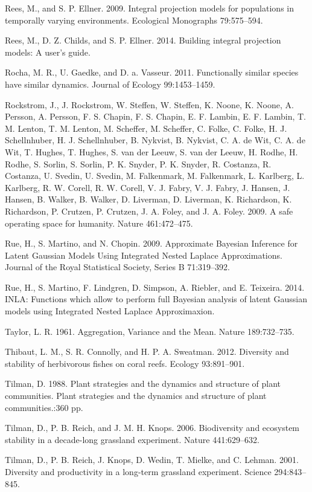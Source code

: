 \documentclass[12pt,]{article}
\begin{document}
Rees, M., and S. P. Ellner. 2009. Integral projection models for
populations in temporally varying environments. Ecological Monographs
79:575--594.

Rees, M., D. Z. Childs, and S. P. Ellner. 2014. Building integral
projection models: A user's guide.

Rocha, M. R., U. Gaedke, and D. a. Vasseur. 2011. Functionally similar
species have similar dynamics. Journal of Ecology 99:1453--1459.

Rockstrom, J., J. Rockstrom, W. Steffen, W. Steffen, K. Noone, K. Noone,
A. Persson, A. Persson, F. S. Chapin, F. S. Chapin, E. F. Lambin, E. F.
Lambin, T. M. Lenton, T. M. Lenton, M. Scheffer, M. Scheffer, C. Folke,
C. Folke, H. J. Schellnhuber, H. J. Schellnhuber, B. Nykvist, B.
Nykvist, C. A. de Wit, C. A. de Wit, T. Hughes, T. Hughes, S. van der
Leeuw, S. van der Leeuw, H. Rodhe, H. Rodhe, S. Sorlin, S. Sorlin, P. K.
Snyder, P. K. Snyder, R. Costanza, R. Costanza, U. Svedin, U. Svedin, M.
Falkenmark, M. Falkenmark, L. Karlberg, L. Karlberg, R. W. Corell, R. W.
Corell, V. J. Fabry, V. J. Fabry, J. Hansen, J. Hansen, B. Walker, B.
Walker, D. Liverman, D. Liverman, K. Richardson, K. Richardson, P.
Crutzen, P. Crutzen, J. A. Foley, and J. A. Foley. 2009. A safe
operating space for humanity. Nature 461:472--475.

Rue, H., S. Martino, and N. Chopin. 2009. Approximate Bayesian Inference
for Latent Gaussian Models Using Integrated Nested Laplace
Approximations. Journal of the Royal Statistical Society, Series B
71:319--392.

Rue, H., S. Martino, F. Lindgren, D. Simpson, A. Riebler, and E.
Teixeira. 2014. INLA: Functions which allow to perform full Bayesian
analysis of latent Gaussian models using Integrated Nested Laplace
Approximaxion.

Taylor, L. R. 1961. Aggregation, Variance and the Mean. Nature
189:732--735.

Thibaut, L. M., S. R. Connolly, and H. P. A. Sweatman. 2012. Diversity
and stability of herbivorous fishes on coral reefs. Ecology 93:891--901.

Tilman, D. 1988. Plant strategies and the dynamics and structure of
plant communities. Plant strategies and the dynamics and structure of
plant communities.:360 pp.

Tilman, D., P. B. Reich, and J. M. H. Knops. 2006. Biodiversity and
ecosystem stability in a decade-long grassland experiment. Nature
441:629--632.

Tilman, D., P. B. Reich, J. Knops, D. Wedin, T. Mielke, and C. Lehman.
2001. Diversity and productivity in a long-term grassland experiment.
Science 294:843--845.
\end{document}
